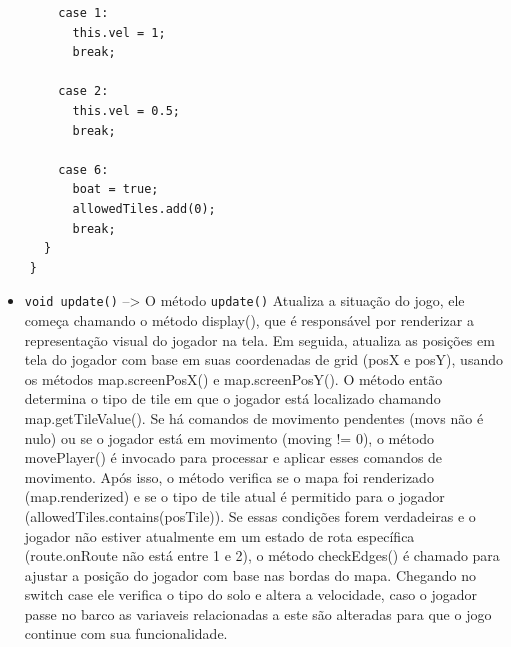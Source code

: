 \documentclass[
	12pt,				%
	oneside,			%
	a4paper,			%
	english,			%
	brazil,				%
	]{abntex2}
\begin{document}
{\begin{lstlisting}
        case 1:
          this.vel = 1;
          break;
          
        case 2:
          this.vel = 0.5;
          break;
          
        case 6:
          boat = true;
          allowedTiles.add(0);
          break;
      }
    }
\end{lstlisting}

\begin{itemize}
    \item \texttt{void update()} --> O método \texttt{update()} Atualiza a situação do jogo, ele  começa chamando o método display(), que é responsável por renderizar a representação visual do jogador na tela. Em seguida, atualiza as posições em tela do jogador com base em suas coordenadas de grid (posX e posY), usando os métodos map.screenPosX() e map.screenPosY().
    O método então determina o tipo de tile em que o jogador está localizado chamando map.getTileValue(). Se há comandos de movimento pendentes (movs não é nulo) ou se o jogador está em movimento (moving != 0), o método movePlayer() é invocado para processar e aplicar esses comandos de movimento.
    Após isso, o método verifica se o mapa foi renderizado (map.renderized) e se o tipo de tile atual é permitido para o jogador (allowedTiles.contains(posTile)). Se essas condições forem verdadeiras e o jogador não estiver atualmente em um estado de rota específica (route.onRoute não está entre 1 e 2), o método checkEdges() é chamado para ajustar a posição do jogador com base nas bordas do mapa.
    Chegando no switch case ele verifica o tipo do solo e altera a velocidade, caso o jogador passe no barco as variaveis relacionadas a este são alteradas para que o jogo continue com sua funcionalidade.
    
\end{itemize}



}
\end{document}
